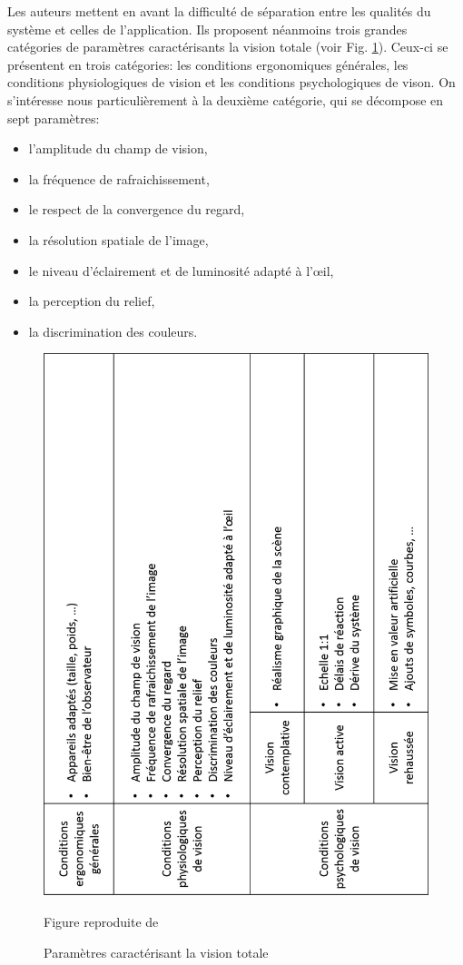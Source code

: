 		\par Les auteurs mettent en avant la difficulté de séparation entre les qualités du système et celles de l'application. Ils proposent néanmoins trois grandes catégories de paramètres caractérisants la vision totale (voir Fig. \ref{fig:burdea_coiffet_tableau}). Ceux-ci se présentent en trois catégories: les conditions ergonomiques générales, les conditions physiologiques de vision et les conditions psychologiques de vison. On s'intéresse nous particulièrement à la deuxième catégorie, qui se décompose en sept paramètres:
		\begin{itemize}
			\item l'amplitude du champ de vision,
			\item la fréquence de rafraichissement,
			\item le respect de la convergence du regard,
			\item la résolution spatiale de l'image,
			\item le niveau d'éclairement et de luminosité adapté à l'œil,
			\item la perception du relief,
			\item la discrimination des couleurs.
		\end{itemize}
		
	\begin{figure}
		\centering
		\includegraphics[scale=.75]{Figures/BurdeaCoiffetTableau}
		\caption{Paramètres caractérisant la vision totale}{Figure reproduite de \citep{burdea_realite_1993}}
		\label{fig:burdea_coiffet_tableau}
	\end{figure}
	
